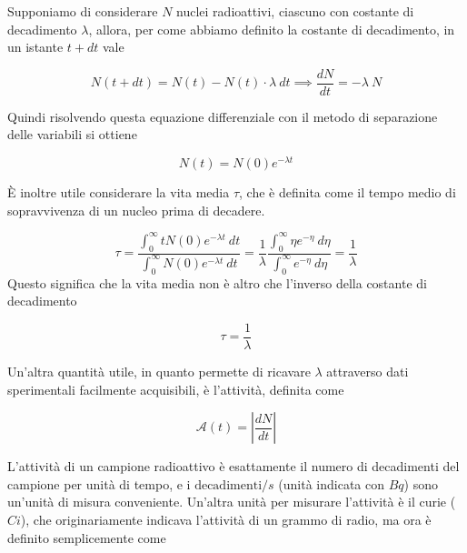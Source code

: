 Supponiamo di considerare $N$ nuclei radioattivi, ciascuno con costante di decadimento $\lambda$, allora, per come abbiamo definito la costante di decadimento, in un istante $t + dt$ vale

\begin{tcolorbox}[colback=black!5!white, colframe=black!45!white, boxrule=0.8pt]
\begin{equation}
    N(t + dt) = N(t) - N(t) \cdot \lambda \ dt \implies \frac{dN}{dt} = - \lambda \ N
\end{equation}
\end{tcolorbox}
Quindi risolvendo questa equazione differenziale con il metodo di separazione delle variabili si ottiene 

\begin{tcolorbox}[colback=black!5!white, colframe=black!45!white, boxrule=0.8pt]
\begin{equation}
    N(t) = N(0) e^{-\lambda t}
\end{equation}
\end{tcolorbox}
È inoltre utile considerare la vita media $\tau$, che è definita come il tempo medio di sopravvivenza di un nucleo prima di decadere. 

\begin{equation}
    \tau = \frac{\int_{0}^{\infty} t N(0) e^{-\lambda t} \ dt}{\int_{0}^{\infty} N(0) e^{-\lambda t} \ dt} = \frac{1}{\lambda} \frac{\int_{0}^{\infty} \eta e^{-\eta} \ d\eta}{\int_{0}^{\infty} e^{-\eta} \ d\eta} = \frac{1}{\lambda}
\end{equation}
Questo significa che la vita media non è altro che l'inverso della costante di decadimento 

\begin{tcolorbox}[colback=black!5!white, colframe=black!45!white, boxrule=0.8pt]
\begin{equation}
    \tau = \frac{1}{\lambda}
\end{equation}
\end{tcolorbox}

\newpage

Un'altra quantità utile, in quanto permette di ricavare $\lambda$ attraverso dati sperimentali facilmente acquisibili, è l'attività, definita come 

\begin{tcolorbox}[colback=black!5!white, colframe=black!45!white, boxrule=0.8pt]
\begin{equation}
    \mathcal{A}(t) = \left|\frac{dN}{dt}\right|
\end{equation}
\end{tcolorbox}
L'attività di un campione radioattivo è esattamente il numero di decadimenti del campione per unità di tempo, e i $\text{decadimenti}/s$ (unità indicata con $Bq$) sono un'unità di misura conveniente. Un'altra unità per misurare l'attività è il curie ($Ci$), che originariamente indicava l'attività di un grammo di radio, ma ora è definito semplicemente come

